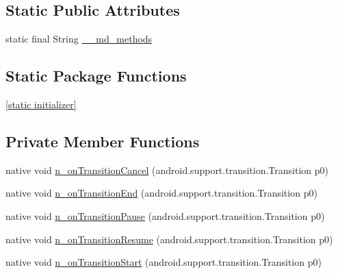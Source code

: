 \subsection*{Static Public Attributes}
\begin{CompactItemize}
\item 
static final String \hyperlink{classmono_1_1android_1_1support_1_1transition_1_1_transition___transition_listener_implementor_b6b0828df9171762b499bd4c4d860c22}{\_\-\_\-md\_\-methods}
\end{CompactItemize}
\subsection*{Static Package Functions}
\begin{CompactItemize}
\item 
\hyperlink{classmono_1_1android_1_1support_1_1transition_1_1_transition___transition_listener_implementor_2e28c295296283227b11412b7bebbb47}{\mbox{[}static initializer\mbox{]}}
\end{CompactItemize}
\subsection*{Private Member Functions}
\begin{CompactItemize}
\item 
native void \hyperlink{classmono_1_1android_1_1support_1_1transition_1_1_transition___transition_listener_implementor_dd8e56192b1ca04becb1d36a796b2cbe}{n\_\-onTransitionCancel} (android.support.transition.Transition p0)
\item 
native void \hyperlink{classmono_1_1android_1_1support_1_1transition_1_1_transition___transition_listener_implementor_3c5e044252e6c25439ac7adddbb074a2}{n\_\-onTransitionEnd} (android.support.transition.Transition p0)
\item 
native void \hyperlink{classmono_1_1android_1_1support_1_1transition_1_1_transition___transition_listener_implementor_3ee305b4d57e5ed10b124beb9c149c8e}{n\_\-onTransitionPause} (android.support.transition.Transition p0)
\item 
native void \hyperlink{classmono_1_1android_1_1support_1_1transition_1_1_transition___transition_listener_implementor_a2d9fa7be6a502017182b810d545bafe}{n\_\-onTransitionResume} (android.support.transition.Transition p0)
\item 
native void \hyperlink{classmono_1_1android_1_1support_1_1transition_1_1_transition___transition_listener_implementor_85a5302f468d5d425455fa21a8e40fb0}{n\_\-onTransitionStart} (android.support.transition.Transition p0)
\end{CompactItemize}
